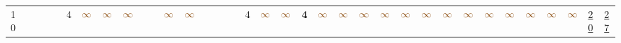 \begin{landscape}
\begin{table}
\begin{adjustwidth}{-2.6cm}{}
{\begin{tabular}{l|lllllllllllllllllllllllllllllllll|ll}
		10   &            &                                                                 &                                                                 &                                                                 & 4                                                               & $\textcolor[rgb]{0.541,0.29,0.043}{\infty}$ & $\textcolor[rgb]{0.541,0.29,0.043}{\infty}$ & $\textcolor[rgb]{0.541,0.29,0.043}{\infty}$ &                                                                 &                                                                 & $\textcolor[rgb]{0.541,0.29,0.043}{\infty}$ & $\textcolor[rgb]{0.541,0.29,0.043}{\infty}$ &                                                                 &                                                                 &                                                                 &                                                                 & 4                                                               & $\textcolor[rgb]{0.541,0.29,0.043}{\infty}$ & $\textcolor[rgb]{0.541,0.29,0.043}{\infty}$ & \textbf{4}                                                      & $\textcolor[rgb]{0.541,0.29,0.043}{\infty}$ & $\textcolor[rgb]{0.541,0.29,0.043}{\infty}$ & $\textcolor[rgb]{0.541,0.29,0.043}{\infty}$ & $\textcolor[rgb]{0.541,0.29,0.043}{\infty}$ & $\textcolor[rgb]{0.541,0.29,0.043}{\infty}$ & $\textcolor[rgb]{0.541,0.29,0.043}{\infty}$ & $\textcolor[rgb]{0.541,0.29,0.043}{\infty}$ & $\textcolor[rgb]{0.541,0.29,0.043}{\infty}$ & $\textcolor[rgb]{0.541,0.29,0.043}{\infty}$ & $\textcolor[rgb]{0.541,0.29,0.043}{\infty}$ & $\textcolor[rgb]{0.541,0.29,0.043}{\infty}$ & $\textcolor[rgb]{0.541,0.29,0.043}{\infty}$ & $\textcolor[rgb]{0.541,0.29,0.043}{\infty}$ & \uline{20} & \uline{27}  \\

\end{tabular}}
\end{adjustwidth}
\end{table}
\end{landscape}
